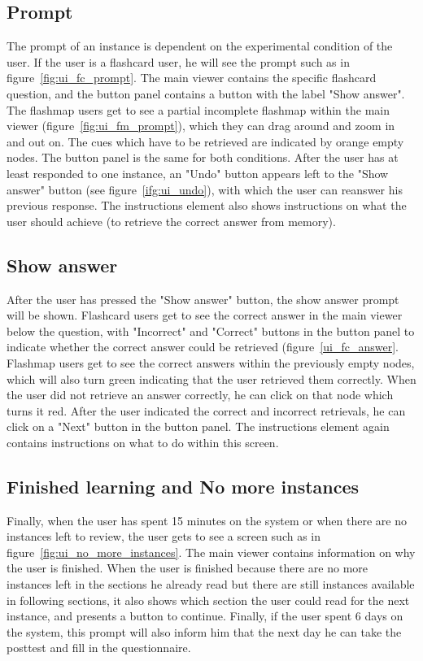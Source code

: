 \subsection{Prompt}

The prompt of an instance is dependent on the experimental condition of the user. If the user is a flashcard user, he will see the prompt such as in figure~\ref{fig:ui_fc_prompt}. The main viewer contains the specific flashcard question, and the button panel contains a button with the label "Show answer". The flashmap users get to see a partial incomplete flashmap within the main viewer (figure~\ref{fig:ui_fm_prompt}), which they can drag around and zoom in and out on. The cues which have to be retrieved are indicated by orange empty nodes. The button panel is the same for both conditions. After the user has at least responded to one instance, an "Undo" button appears left to the "Show answer" button (see figure~\ref{ifg:ui_undo}), with which the user can reanswer his previous response. The instructions element also shows instructions on what the user should achieve (to retrieve the correct answer from memory).

\subsection{Show answer}

After the user has pressed the "Show answer" button, the show answer prompt will be shown. Flashcard users get to see the correct answer in the main viewer below the question, with "Incorrect" and "Correct" buttons in the button panel to indicate whether the correct answer could be retrieved (figure~\ref{ui_fc_answer}. Flashmap users get to see the correct answers within the previously empty nodes, which will also turn green indicating that the user retrieved them correctly. When the user did not retrieve an answer correctly, he can click on that node which turns it red. After the user indicated the correct and incorrect retrievals, he can click on a "Next" button in the button panel. The instructions element again contains instructions on what to do within this screen.

\subsection{Finished learning and No more instances}

Finally, when the user has spent 15 minutes on the system or when there are no instances left to review, the user gets to see a screen such as in figure~\ref{fig:ui_no_more_instances}. The main viewer contains information on why the user is finished. When the user is finished because there are no more instances left in the sections he already read but there are still instances available in following sections, it also shows which section the user could read for the next instance, and presents a button to continue. Finally, if the user spent 6 days on the system, this prompt will also inform him that the next day he can take the posttest and fill in the questionnaire.

